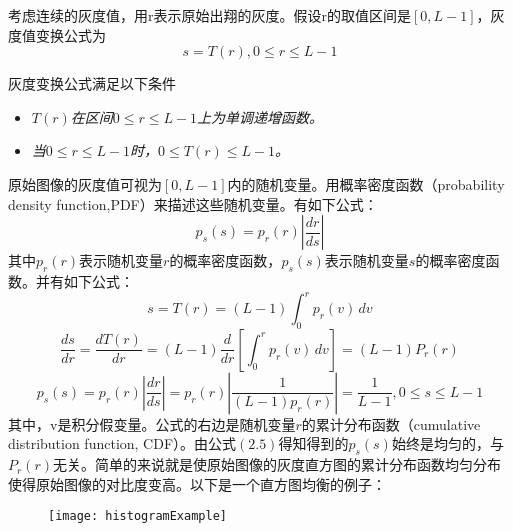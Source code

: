 考虑连续的灰度值，用r表示原始出翔的灰度。假设r的取值区间是$[0,L-1]$，灰度值变换公式为
\begin{equation}s=T(r),0 \leq r\leq L-1 \end{equation}

灰度变换公式满足以下条件
			\begin{itemize}
				\item \emph{$T(r)$在区间$0\leq r\leq L-1$上为单调递增函数。}
				\item \emph{当$0\leq r\leq L-1$时，$0\leq T(r) \leq L-1$。}
			\end{itemize}

原始图像的灰度值可视为$[0,L-1]$内的随机变量。用概率密度函数（probability density function,PDF）来描述这些随机变量。有如下公式：
\begin{equation}p_s(s)=p_r(r)|\frac{dr}{ds}|\end{equation}	
其中$p_r(r)$表示随机变量$r$的概率密度函数，$p_s(s)$表示随机变量$s$的概率密度函数。并有如下公式：
\begin{equation}     s=T(r)=(L-1)\int_0^r p_r(v)\,dv    \end{equation}	
\begin{equation}     \frac{ds}{dr}=\frac{dT(r)}{dr}=(L-1)\frac{d}{dr}\left[\int_0^r p_r(v)\,dv 	\right]=(L-1)P_r(r)     \end{equation}
\begin{equation}     p_s(s)=p_r(r) \left| \frac{dr}{ds}\right| =p_r(r) \left| \frac{1}{(L-1)p_r(r)} \right| = \frac{1}{L-1},0 \leq s \leq L-1    \end{equation}
其中，v是积分假变量。公式的右边是随机变量$r$的累计分布函数（cumulative distribution function, CDF）。由公式$(2.5)$得知得到的$p_s(s)$始终是均匀的，与$P_r(r)$无关。简单的来说就是使原始图像的灰度直方图的累计分布函数均匀分布使得原始图像的对比度变高。以下是一个直方图均衡的例子：

\begin{figure}[!htbp]
    \centering
    \texttt{[image: histogramExample]}
    \label{fig:tc_q_criteria}
\end{figure}

